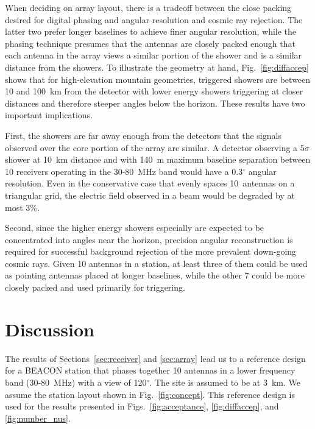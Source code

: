\documentclass{PoS}
\begin{document}
When deciding on array layout, there is a tradeoff between the close packing desired for digital phasing and angular resolution and cosmic ray rejection. The latter two prefer longer baselines to achieve finer angular resolution, while the phasing technique presumes that the antennas are closely packed enough that each antenna in the array views a similar portion of the shower and is a similar distance from the showers. To illustrate the geometry at hand, Fig.~\ref{fig:diffaccep} shows that for high-elevation mountain geometries, triggered showers are between 10 and 100~km from the detector with lower energy showers triggering at closer distances and therefore steeper angles below the horizon. These results have two important implications. 

First, the showers are far away enough from the detectors that the signals observed over the core portion of the array are similar. A detector observing a 5$\sigma$ shower at 10~km distance and with 140~m maximum baseline separation between 10 receivers operating in the 30-80~MHz band would have a 0.3$^{\circ}$ angular resolution. Even in the conservative case that evenly spaces 10~antennas on a triangular grid, the electric field observed in a beam would be degraded by at most 3\%. 

Second, since the higher energy showers especially are expected to be concentrated into angles near the horizon, precision angular reconstruction is required for successful background rejection of the more prevalent down-going cosmic rays.  Given 10 antennas in a station, at least three of them could be used as pointing antennas placed at longer baselines, while the other 7 could be more closely packed and used primarily for triggering. 

\section{Discussion}
The results of Sections~\ref{sec:receiver} and \ref{sec:array} lead us to a reference design for a BEACON station that phases together 10 antennas in a lower frequency band (30-80~MHz) with a view of 120$^{\circ}$. The site is assumed to be at 3~km. We assume the station layout shown in Fig.~\ref{fig:concept}. This reference design is used for the results presented in Figs.~\ref{fig:acceptance}, \ref{fig:diffaccep}, and \ref{fig:number_nus}.
\end{document}
